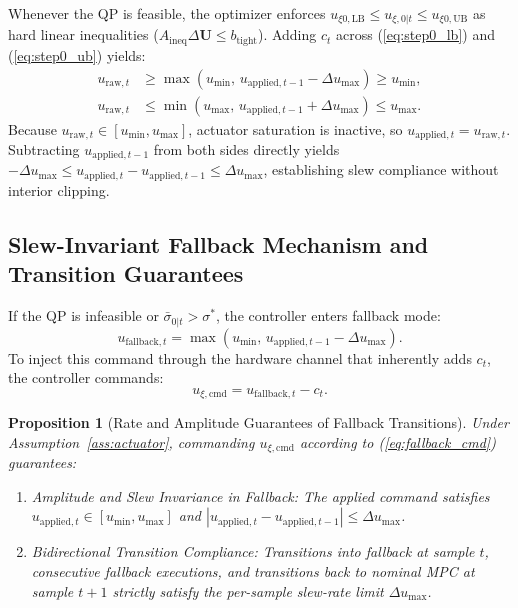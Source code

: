 \documentclass[journal]{IEEEtran}
\newtheorem{proposition}{Proposition}
\begin{document}
\begin{IEEEproof}
Whenever the QP is feasible, the optimizer enforces $u_{\xi 0,\mathrm{LB}} \le u_{\xi,0|t} \le u_{\xi 0,\mathrm{UB}}$ as hard linear inequalities ($A_{\mathrm{ineq}} \Delta \mathbf{U} \le b_{\mathrm{tight}}$). Adding $c_t$ across (\ref{eq:step0_lb}) and (\ref{eq:step0_ub}) yields:
\begin{align}
u_{\mathrm{raw},t} &\ge \max\left(u_{\min}, \, u_{\mathrm{applied},t-1} - \Delta u_{\max}\right) \ge u_{\min}, \\
u_{\mathrm{raw},t} &\le \min\left(u_{\max}, \, u_{\mathrm{applied},t-1} + \Delta u_{\max}\right) \le u_{\max}.
\end{align}
Because $u_{\mathrm{raw},t} \in [u_{\min}, u_{\max}]$, actuator saturation is inactive, so $u_{\mathrm{applied},t} = u_{\mathrm{raw},t}$. Subtracting $u_{\mathrm{applied},t-1}$ from both sides directly yields $-\Delta u_{\max} \le u_{\mathrm{applied},t} - u_{\mathrm{applied},t-1} \le \Delta u_{\max}$, establishing slew compliance without interior clipping.
\end{IEEEproof}

\subsection{Slew-Invariant Fallback Mechanism and Transition Guarantees}

If the QP is infeasible or $\bar\sigma_{0|t} > \sigma^*$, the controller enters fallback mode:
\begin{equation}
u_{\mathrm{fallback},t} = \max\left(u_{\min}, \, u_{\mathrm{applied},t-1} - \Delta u_{\max}\right).
\label{eq:fallback}
\end{equation}
To inject this command through the hardware channel that inherently adds $c_t$, the controller commands:
\begin{equation}
u_{\xi,\mathrm{cmd}} = u_{\mathrm{fallback},t} - c_t.
\label{eq:fallback_cmd}
\end{equation}

\begin{proposition}[Rate and Amplitude Guarantees of Fallback Transitions]
Under Assumption~\ref{ass:actuator}, commanding $u_{\xi,\mathrm{cmd}}$ according to (\ref{eq:fallback_cmd}) guarantees:
\begin{enumerate}
    \item \emph{Amplitude and Slew Invariance in Fallback:} The applied command satisfies $u_{\mathrm{applied},t} \in [u_{\min}, u_{\max}]$ and $|u_{\mathrm{applied},t} - u_{\mathrm{applied},t-1}| \le \Delta u_{\max}$.
    \item \emph{Bidirectional Transition Compliance:} Transitions into fallback at sample $t$, consecutive fallback executions, and transitions back to nominal MPC at sample $t+1$ strictly satisfy the per-sample slew-rate limit $\Delta u_{\max}$.
\end{enumerate}
\end{proposition}
\end{document}
